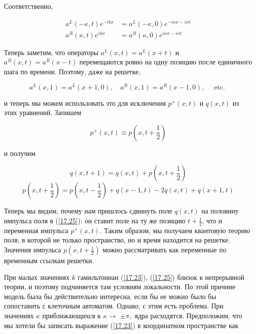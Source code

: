 \documentclass[main.tex]{subfiles}
\begin{document}
Соответственно,

\begin{equation}\label{17.28}
	\begin{aligned} a^{L}(-\kappa, t) e^{-i k x} &=a^{L}(-\kappa, 0) e^{-i \kappa x-i \kappa t} \\ a^{R}(\kappa, t) e^{i k x} &=a^{R}(\kappa, 0) e^{i \kappa x-i \kappa t} \end{aligned}
\end{equation}

Теперь заметим, что операторы $a^{L}(x, t)=a^{L}(x+t)$ и $a^{R}(x, t)=a^{R}(x-t)$ перемещаются ровно на одну позицию после единичного шага по времени. Поэтому, даже на решетке,

\begin{equation}\label{17.29}
a^{L}(x, 1)=a^{L}(x+1,0), \quad a^{R}(x, 1)=a^{R}(x-1,0), \quad \text { etc. }
\end{equation}

и теперь мы можем использовать это для исключения $p^{+}(x, t)$ и $q(x, t)$ из этих уравнений. Запишем

\begin{equation}\label{17.}
p^{+}(x, t) \equiv p\left(x, t+\frac{1}{2}\right)
\end{equation}

и получим

\begin{equation}\label{17.}
q(x, t+1)=q(x, t)+p\left(x, t+\frac{1}{2}\right)
\end{equation}
\begin{equation}\label{17.}
p\left(x, t+\frac{1}{2}\right)=p\left(x, t-\frac{1}{2}\right)+q(x-1, t)-2 q(x, t)+q(x+1, t)
\end{equation}

Теперь мы видим, почему нам пришлось сдвинуть поле $q(x, t)$ на половину импульса поля в (\ref{17.25}): он ставит поле на ту же позицию $t+\frac{1}{2}$, что и переменная импульса $p^{+}(x, t)$.
Таким образом, мы получаем квантовую теорию поля, в которой не только пространство, но и время находится на решетке. Значения импульса $p\left(x, t+\frac{1}{2}\right)$ можно рассматривать как переменные по временным ссылкам решетки.

При малых значениях $k$ гамильтониан (\ref{17.23}), (\ref{17.25}) близок к непрерывной теории, и поэтому подчиняется там условиям локальности. По этой причине модель была бы действительно интересна, если бы ее можно было бы сопоставить с клеточным автоматом. Однако, с этим есть проблема. При значениях $\kappa$ приближающихся к $\kappa \rightarrow$ $\pm \pi,$ ядра расходятся. Предположим, что мы хотели бы записать выражение (\ref{17.23}) в координатном пространстве как
\end{document}
